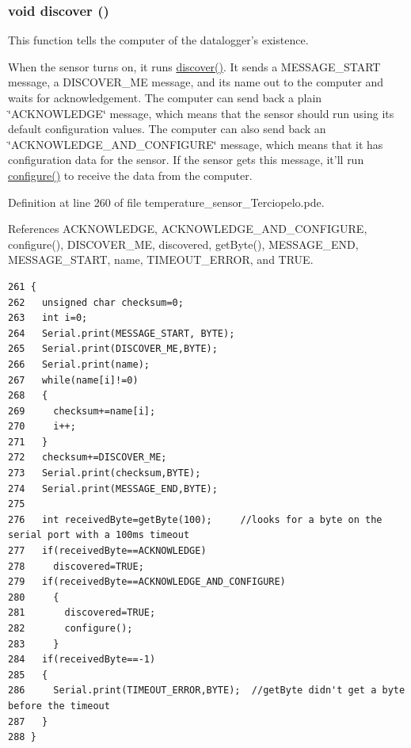 \hypertarget{temperature__sensor___terciopelo_8pde_3fdb2350c3f98c0de0f0ae3c831a8b14}{
\subsubsection[{discover}]{\setlength{\rightskip}{0pt plus 5cm}void discover ()}}
\label{temperature__sensor___terciopelo_8pde_3fdb2350c3f98c0de0f0ae3c831a8b14}


This function tells the computer of the datalogger's existence. 

When the sensor turns on, it runs \hyperlink{nublogger_8h_3fdb2350c3f98c0de0f0ae3c831a8b14}{discover()}. It sends a MESSAGE\_\-START message, a DISCOVER\_\-ME message, and its name out to the computer and waits for acknowledgement. The computer can send back a plain \char`\"{}ACKNOWLEDGE\char`\"{} message, which means that the sensor should run using its default configuration values. The computer can also send back an \char`\"{}ACKNOWLEDGE\_\-AND\_\-CONFIGURE\char`\"{} message, which means that it has configuration data for the sensor. If the sensor gets this message, it'll run \hyperlink{nublogger_8h_e369b3765489ee8bd0ea791c1843630f}{configure()} to receive the data from the computer. 

Definition at line 260 of file temperature\_\-sensor\_\-Terciopelo.pde.

References ACKNOWLEDGE, ACKNOWLEDGE\_\-AND\_\-CONFIGURE, configure(), DISCOVER\_\-ME, discovered, getByte(), MESSAGE\_\-END, MESSAGE\_\-START, name, TIMEOUT\_\-ERROR, and TRUE.

\begin{Code}\begin{verbatim}261 { 
262   unsigned char checksum=0;
263   int i=0;
264   Serial.print(MESSAGE_START, BYTE);
265   Serial.print(DISCOVER_ME,BYTE);
266   Serial.print(name);
267   while(name[i]!=0)
268   {
269     checksum+=name[i];
270     i++;
271   }
272   checksum+=DISCOVER_ME;
273   Serial.print(checksum,BYTE);
274   Serial.print(MESSAGE_END,BYTE);
275 
276   int receivedByte=getByte(100);     //looks for a byte on the serial port with a 100ms timeout
277   if(receivedByte==ACKNOWLEDGE)
278     discovered=TRUE;
279   if(receivedByte==ACKNOWLEDGE_AND_CONFIGURE)
280     {
281       discovered=TRUE;
282       configure();
283     }
284   if(receivedByte==-1)
285   {
286     Serial.print(TIMEOUT_ERROR,BYTE);  //getByte didn't get a byte before the timeout
287   }  
288 }
\end{verbatim}
\end{Code}


